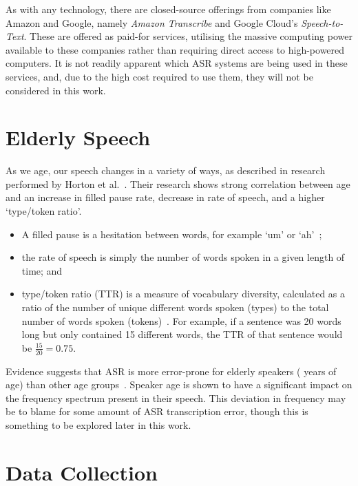 As with any technology, there are closed-source offerings from companies like Amazon and Google,
namely \emph{Amazon Transcribe} and Google Cloud's \emph{Speech-to-Text}.
These are offered as paid-for services, utilising the massive computing power available to these
companies rather than requiring direct access to high-powered computers.
It is not readily apparent which ASR systems are being used in these services, and, due to the
high cost required to use them, they will not be considered in this work.

\section{Elderly Speech}\label{sec:elderly-speech}

As we age, our speech changes in a variety of ways, as described in research
performed by Horton et al.~\cite{Horton2010}.
Their research shows strong correlation between age and an increase in filled pause rate,
decrease in rate of speech, and a higher `type/token ratio'.

\begin{itemize}
    \item A filled pause is a hesitation between words, for example `um' or
    `ah'~\cite{Maclay1959Jan};
    \item the rate of speech is simply the number of words spoken in a given length of time;
    and
    \item type/token ratio (TTR) is a measure of vocabulary diversity, calculated as a ratio of
    the number of unique different words spoken (types) to the total number of words spoken
    (tokens)~\cite{richards_1987}.
    For example, if a sentence was 20 words long but only contained 15 different words, the TTR of
    that sentence would be $\frac{15}{20} = 0.75$.
\end{itemize}

Evidence suggests that ASR is more error-prone for elderly speakers ( years of
age) than other age groups~\cite{picone1990,vote400}.
Speaker age is shown to have a significant impact on the frequency spectrum present in their
speech\cite{Taylor2020Mar}.
This deviation in frequency may be to blame for some amount of ASR transcription error, though
this is something to be explored later in this work.

\section{Data Collection}\label{sec:data-collection}

